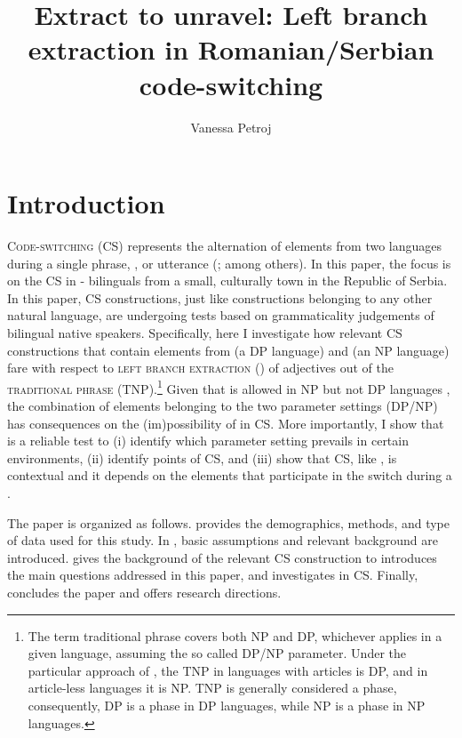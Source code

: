 \documentclass[output=paper,hidelinks,newtxmath,]{langscibook}
\title{Extract to unravel: Left branch extraction in Romanian/Serbian code-switching}
\author{Vanessa Petroj\affiliation{University of Connecticut}}
\begin{document}
\maketitle
{}

\section{Introduction}\label{15:s1}

\textsc{Code-switching} (CS) represents the alternation of elements from two languages during a single phrase, , or utterance (\citealt{Poplack1980,GonzalesVelasquez1995,MacSwan1999,Muysken2000}; among others). In this paper, the focus is on the CS in - bilinguals from a small, culturally  town in the Republic of Serbia. In this paper, CS constructions, just like constructions belonging to any other natural language, are undergoing tests based on grammaticality judgements of bilingual native speakers. Specifically, here I investigate how relevant CS constructions that contain elements from  (a DP language) and  (an NP language) fare with respect to \textsc{left branch extraction} () of adjectives out of the \textsc{traditional  phrase} (TNP).\footnote{\label{15:fn1}The term traditional  phrase covers both NP and DP, whichever applies in a given language, assuming the so called DP/NP parameter. Under the particular approach of \citet{Boskovic2014}, the TNP in languages with articles is DP, and in article-less languages it is NP. TNP is generally considered a phase, consequently, DP is a phase in DP languages, while NP is a phase in NP languages.} Given that  is allowed in NP but not DP languages \citep{Uriagereka1988,Boskovic2008,Boskovic2012}, the combination of elements belonging to the two parameter settings (DP/NP) has consequences on the (im)possibility of  in CS. More importantly, I show that  is a reliable test to (i) identify which parameter setting prevails in certain environments, (ii) identify points of CS, and (iii) show that CS, like , is contextual and it depends on the elements that participate in the switch during a .

The paper is organized as follows.  provides the demographics, methods, and type of data used for this study. In , basic assumptions and relevant  background are introduced.  gives the background of the relevant CS construction to introduces the main questions addressed in this paper, and  investigates  in CS. Finally,  concludes the paper and offers  research directions.
\end{document}

